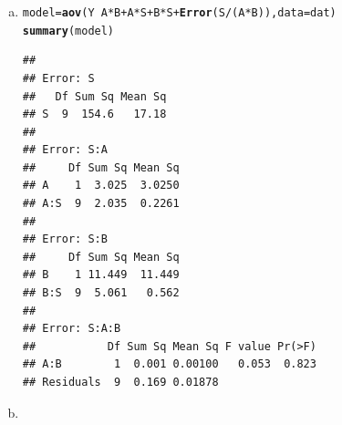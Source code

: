 \documentclass{article}\usepackage[]{graphicx}\usepackage[]{color}
\makeatletter
\newcommand{\hlopt}[1]{\textcolor[rgb]{0,0,0}{#1}}%
\newcommand{\hlstd}[1]{\textcolor[rgb]{0.345,0.345,0.345}{#1}}%
\newcommand{\hlkwb}[1]{\textcolor[rgb]{0.69,0.353,0.396}{#1}}%
\newcommand{\hlkwc}[1]{\textcolor[rgb]{0.333,0.667,0.333}{#1}}%
\newcommand{\hlkwd}[1]{\textcolor[rgb]{0.737,0.353,0.396}{\textbf{#1}}}%
\newenvironment{kframe}{%
 \def\at@end@of@kframe{}%
 \ifinner\ifhmode%
  \def\at@end@of@kframe{\end{minipage}}%
  \begin{minipage}{\columnwidth}%
 \fi\fi%
 \def\FrameCommand##1{\hskip\@totalleftmargin \hskip-\fboxsep
 \colorbox{shadecolor}{##1}\hskip-\fboxsep
     \hskip-\linewidth \hskip-\@totalleftmargin \hskip\columnwidth}%
 \MakeFramed {\advance\hsize-\width
   \@totalleftmargin\z@ \linewidth\hsize
   \@setminipage}}%
 {\par\unskip\endMakeFramed%
 \at@end@of@kframe}
\newenvironment{knitrout}{}{} %
\makeatother
\begin{document}
\begin{enumerate}[(a)]

\item

\begin{knitrout}
\color{fgcolor}\begin{kframe}
\begin{alltt}
  \hlstd{model} \hlkwb{=} \hlkwd{aov}\hlstd{(Y}\hlopt{~} \hlstd{A}\hlopt{*}\hlstd{B}\hlopt{+}\hlstd{A}\hlopt{*}\hlstd{S}\hlopt{+}\hlstd{B}\hlopt{*}\hlstd{S}\hlopt{+} \hlkwd{Error}\hlstd{(S}\hlopt{/}\hlstd{(A}\hlopt{*}\hlstd{B)),} \hlkwc{data} \hlstd{= dat)}
  \hlkwd{summary}\hlstd{(model)}
\end{alltt}
\begin{verbatim}
## 
## Error: S
##   Df Sum Sq Mean Sq
## S  9  154.6   17.18
## 
## Error: S:A
##     Df Sum Sq Mean Sq
## A    1  3.025  3.0250
## A:S  9  2.035  0.2261
## 
## Error: S:B
##     Df Sum Sq Mean Sq
## B    1 11.449  11.449
## B:S  9  5.061   0.562
## 
## Error: S:A:B
##           Df Sum Sq Mean Sq F value Pr(>F)
## A:B        1  0.001 0.00100   0.053  0.823
## Residuals  9  0.169 0.01878
\end{verbatim}
\end{kframe}
\end{knitrout}

\item


\end{enumerate}
\end{document}
